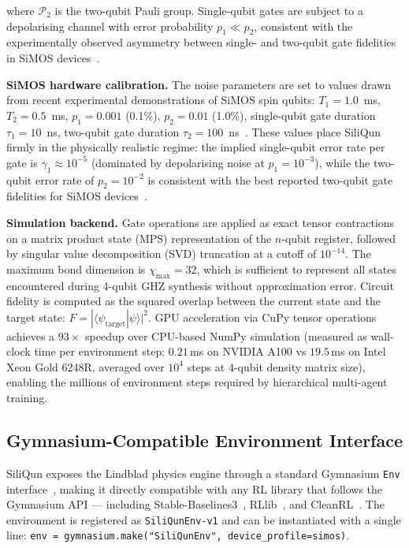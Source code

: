 where $\mathcal{P}_2$ is the two-qubit Pauli group. Single-qubit gates are subject to a depolarising channel with error probability $p_1 \ll p_2$, consistent with the experimentally observed asymmetry between single- and two-qubit gate fidelities in SiMOS devices~\cite{Xue2022,Noiri2022}.

\textbf{SiMOS hardware calibration.} The noise parameters are set to values drawn from recent experimental demonstrations of SiMOS spin qubits: $T_1 = 1.0$~ms, $T_2 = 0.5$~ms, $p_1 = 0.001$ (0.1\%), $p_2 = 0.01$ (1.0\%), single-qubit gate duration $\tau_1 = 10$~ns, two-qubit gate duration $\tau_2 = 100$~ns~\cite{Xue2022,Noiri2022,Philips2022,Steinacker2023}. These values place SiliQun firmly in the physically realistic regime: the implied single-qubit error rate per gate is $\gamma_1 \approx 10^{-5}$ (dominated by depolarising noise at $p_1 = 10^{-3}$), while the two-qubit error rate of $p_2 = 10^{-2}$ is consistent with the best reported two-qubit gate fidelities for SiMOS devices~\cite{Noiri2022,Philips2022}.

\textbf{Simulation backend.} Gate operations are applied as exact tensor contractions on a matrix product state (MPS) representation of the $n$-qubit register, followed by singular value decomposition (SVD) truncation at a cutoff of $10^{-14}$. The maximum bond dimension is $\chi_\text{max} = 32$, which is sufficient to represent all states encountered during 4-qubit GHZ synthesis without approximation error. Circuit fidelity is computed as the squared overlap between the current state and the target state: $F = |\langle \psi_\text{target} | \psi \rangle|^2$. GPU acceleration via CuPy tensor operations achieves a $93\times$ speedup over CPU-based NumPy simulation (measured as wall-clock time per environment step: $0.21$\,ms on NVIDIA A100 vs $19.5$\,ms on Intel Xeon Gold 6248R, averaged over $10^4$ steps at 4-qubit density matrix size)\label{subsec:gpu_benchmark}, enabling the millions of environment steps required by hierarchical multi-agent training.

\subsection{Gymnasium-Compatible Environment Interface}
\label{subsec:gymnasium}

SiliQun exposes the Lindblad physics engine through a standard Gymnasium \texttt{Env} interface~\cite{Towers2023}, making it directly compatible with any RL library that follows the Gymnasium API — including Stable-Baselines3~\cite{Raffin2021}, RLlib~\cite{Liang2018}, and CleanRL~\cite{Huang2022}. The environment is registered as \texttt{SiliQunEnv-v1} and can be instantiated with a single line: \texttt{env = gymnasium.make("SiliQunEnv", device\_profile=simos)}.

